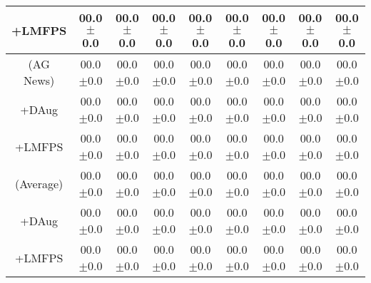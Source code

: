 \documentclass[11pt]{article}
\begin{document}
\begin{table*}
\begin{tabular}{c | c | c | c | c | c | c | c | c}
\small+LMFPS & \small00.0 \small$\pm$\small0.0 & \small00.0 \small$\pm$\small0.0 & \small00.0 \small$\pm$\small0.0 & \small00.0 \small$\pm$\small0.0 & \small00.0 \small$\pm$\small0.0 & \small00.0 \small$\pm$\small0.0 & \small00.0 \small$\pm$\small0.0 & \small00.0 \small$\pm$\small0.0\\
\hline
(AG News) & \small00.0 \small$\pm$\small0.0 & \small00.0 \small$\pm$\small0.0 & \small00.0 \small$\pm$\small0.0 & \small00.0 \small$\pm$\small0.0 & \small00.0 \small$\pm$\small0.0 & \small00.0 \small$\pm$\small0.0 & \small00.0 \small$\pm$\small0.0 & \small00.0 \small$\pm$\small0.0\\
\small+DAug & \small00.0 \small$\pm$\small0.0 & \small00.0 \small$\pm$\small0.0 & \small00.0 \small$\pm$\small0.0 & \small00.0 \small$\pm$\small0.0 & \small00.0 \small$\pm$\small0.0 & \small00.0 \small$\pm$\small0.0 & \small00.0 \small$\pm$\small0.0 & \small00.0 \small$\pm$\small0.0\\
\small+LMFPS & \small00.0 \small$\pm$\small0.0 & \small00.0 \small$\pm$\small0.0 & \small00.0 \small$\pm$\small0.0 & \small00.0 \small$\pm$\small0.0 & \small00.0 \small$\pm$\small0.0 & \small00.0 \small$\pm$\small0.0 & \small00.0 \small$\pm$\small0.0 & \small00.0 \small$\pm$\small0.0\\
\hline
\hline
(Average) & \small00.0 \small$\pm$\small0.0 & \small00.0 \small$\pm$\small0.0 & \small00.0 \small$\pm$\small0.0 & \small00.0 \small$\pm$\small0.0 & \small00.0 \small$\pm$\small0.0 & \small00.0 \small$\pm$\small0.0 & \small00.0 \small$\pm$\small0.0 & \small00.0 \small$\pm$\small0.0\\
\small+DAug & \small00.0 \small$\pm$\small0.0 & \small00.0 \small$\pm$\small0.0 & \small00.0 \small$\pm$\small0.0 & \small00.0 \small$\pm$\small0.0 & \small00.0 \small$\pm$\small0.0 & \small00.0 \small$\pm$\small0.0 & \small00.0 \small$\pm$\small0.0 & \small00.0 \small$\pm$\small0.0\\
\small+LMFPS & \small00.0 \small$\pm$\small0.0 & \small00.0 \small$\pm$\small0.0 & \small00.0 \small$\pm$\small0.0 & \small00.0 \small$\pm$\small0.0 & \small00.0 \small$\pm$\small0.0 & \small00.0 \small$\pm$\small0.0 & \small00.0 \small$\pm$\small0.0 & \small00.0 \small$\pm$\small0.0\\
\hline
\end{tabular}
\label{lmfps-vs-dataaug-vs-main-16-shot}
\end{table*}
\end{document}
